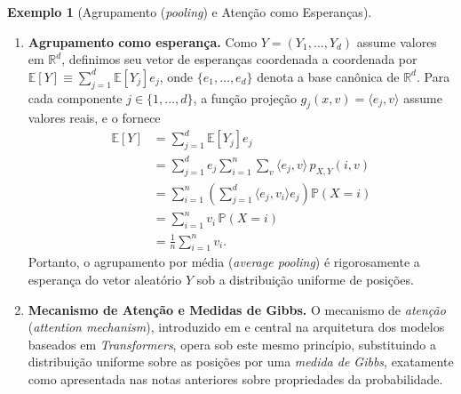 \documentclass[12pt,portuguese]{article}
\theoremstyle{definition}
\newtheorem{example}[example]{Exemplo}
\begin{document}
\begin{example}[Agrupamento (\emph{pooling}) e Atenção como Esperanças]
\begin{enumerate}
\item \textbf{Agrupamento como esperança.} Como $Y=(Y_1,\ldots,Y_d)$ assume
valores em $\mathbb{R}^d$, definimos seu vetor de esperanças coordenada a
coordenada por $\mathbb{E}[Y]\equiv \sum_{j=1}^d \mathbb{E}[Y_j] e_j$, onde
$\{e_1,\ldots,e_d\}$ denota a base canônica de $\mathbb{R}^d$. Para cada
componente $j\in\{1,\ldots,d\}$, a função projeção $g_j(x,v)=\langle e_j,v\rangle$
assume valores reais, e o  fornece
\begin{align*}
\mathbb{E}[Y]
&= 
\sum_{j=1}^d \mathbb{E}[Y_j] e_j
\\[0.3cm]
&=
\sum_{j=1}^d e_j \sum_{i=1}^{n}\sum_{v} \langle e_j,v\rangle  \,p_{X,Y}(i,v)
\\[0.3cm]
&=
\sum_{i=1}^{n} \left( \sum_{j=1}^d \langle e_j,v_i\rangle e_j \right) \mathbb{P}(X=i)
\\[0.3cm]
&=
\sum_{i=1}^{n} v_i\,\mathbb{P}(X=i)
\\[0.3cm]
&=
\frac{1}{n}\sum_{i=1}^{n}v_i.
\end{align*}
Portanto, o agrupamento por média (\emph{average pooling}) é rigorosamente a
esperança do vetor aleatório $Y$ sob a distribuição uniforme de posições.

\item \textbf{Mecanismo de Atenção e Medidas de Gibbs.} O mecanismo de
\emph{atenção} (\emph{attention mechanism}), introduzido em \cite{Vaswani2017}
e central na arquitetura dos modelos baseados em \emph{Transformers}, opera sob
este mesmo princípio, substituindo a distribuição uniforme sobre as posições
por uma \emph{medida de Gibbs}, exatamente como apresentada nas notas
anteriores sobre propriedades da probabilidade.


\end{enumerate}
\end{example}
\end{document}
